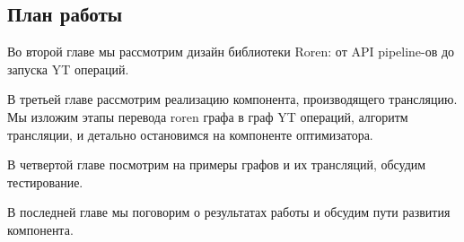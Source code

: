 \subsection{План работы}

Во второй главе мы рассмотрим дизайн библиотеки Roren: от API pipeline-ов до запуска YT операций.

В третьей главе рассмотрим реализацию компонента, производящего трансляцию. Мы изложим этапы перевода roren графа в граф YT операций, алгоритм трансляции, и детально остановимся на компоненте оптимизатора.

В четвертой главе посмотрим на примеры графов и их трансляций, обсудим тестирование.

В последней главе мы поговорим о результатах работы и обсудим пути развития компонента.
